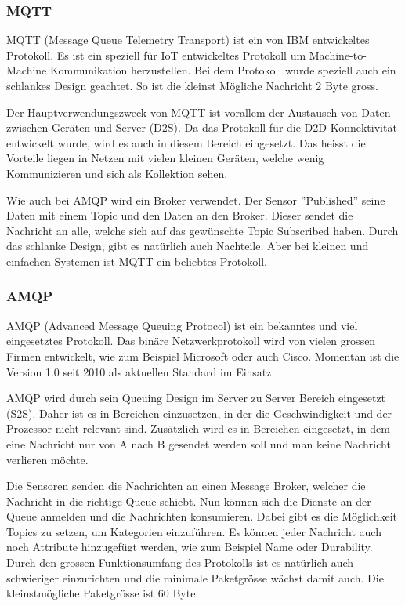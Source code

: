 \subsubsection{MQTT}
MQTT (Message Queue Telemetry Transport) ist ein von IBM entwickeltes Protokoll. Es ist ein speziell für IoT entwickeltes Protokoll um Machine-to-Machine Kommunikation herzustellen. Bei dem Protokoll wurde speziell auch ein schlankes Design geachtet. So ist die kleinst Mögliche Nachricht 2 Byte gross. 

Der Hauptverwendungszweck von MQTT ist vorallem der Austausch von Daten zwischen Geräten und Server (D2S).\cite{ProtPubSub} Da das Protokoll für die D2D Konnektivität entwickelt wurde, wird es auch in diesem Bereich eingesetzt. Das heisst die Vorteile liegen in Netzen mit vielen kleinen Geräten, welche wenig Kommunizieren und sich als Kollektion sehen.\cite{ProtPubSubReason}

Wie auch bei AMQP wird ein Broker verwendet. Der Sensor ''Published'' seine Daten mit einem Topic und den Daten an den Broker. Dieser sendet die Nachricht an alle, welche sich auf das gewünschte Topic Subscribed haben. Durch das schlanke Design, gibt es natürlich auch Nachteile. Aber bei kleinen und einfachen Systemen ist MQTT ein beliebtes Protokoll.
\subsubsection{AMQP}
AMQP (Advanced Message Queuing Protocol) ist ein bekanntes und viel eingesetztes Protokoll. Das binäre Netzwerkprotokoll wird von vielen grossen Firmen\cite{ProtPubSubReason} entwickelt, wie zum Beispiel Microsoft oder auch Cisco. Momentan ist die Version 1.0 seit 2010 als aktuellen Standard im Einsatz.

AMQP wird durch sein Queuing Design im Server zu Server Bereich eingesetzt (S2S).\cite{ProtPubSub} Daher ist es in Bereichen einzusetzen, in der die Geschwindigkeit und der Prozessor nicht relevant sind. Zusätzlich wird es in Bereichen eingesetzt, in dem eine Nachricht nur von A nach B gesendet werden soll und man keine Nachricht verlieren möchte.

Die Sensoren senden die Nachrichten an einen Message Broker, welcher die Nachricht in die richtige Queue schiebt. Nun können sich die Dienste an der Queue anmelden und die Nachrichten konsumieren. Dabei gibt es die Möglichkeit Topics zu setzen, um Kategorien einzuführen. Es können jeder Nachricht auch noch Attribute hinzugefügt werden, wie zum Beispiel Name oder Durability. Durch den grossen Funktionsumfang des Protokolls ist es natürlich auch schwieriger einzurichten und die minimale Paketgrösse wächst damit auch. Die kleinstmögliche Paketgrösse ist 60 Byte.
